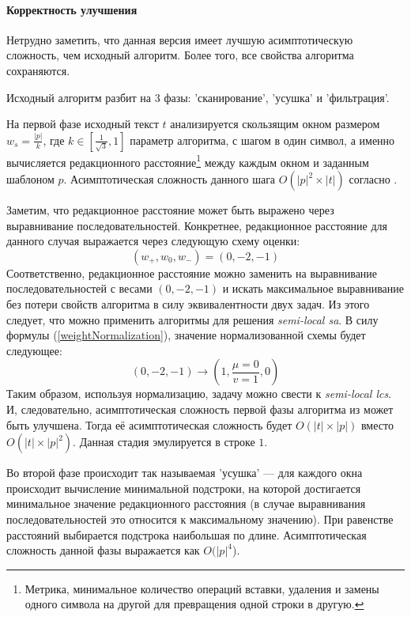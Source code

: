 \paragraph*{Корректность улучшения}\mbox{}

Нетрудно заметить, что данная версия имеет лучшую асимптотическую сложность, чем исходный алгоритм. Более того, все свойства алгоритма сохраняются.

Исходный алгоритм разбит на 3 фазы: 'сканирование', 'усушка' и 'фильтрация'.

На первой фазе исходный текст $t$ анализируется скользящим окном размером $w_{s} = \frac{|p|}{k}$, где $k \in [\frac{1}{\sqrt{3}},1]$ параметр алгоритма, с шагом в один символ, а именно вычисляется редакционного расстояние\footnote{Метрика, минимальное количество операций вставки, удаления и замены одного символа на другой для превращения одной строки в другую.} между каждым окном и заданным шаблоном $p$.
Асимптотическая сложность данного шага $O(|p|^2 \times |t|)$ согласно \cite{luciv2019interactive}.

Заметим, что редакционное расстояние может быть выражено через выравнивание последовательностей.
Конкретнее, редакционное расстояние для данного случая выражается через следующую схему оценки:
\begin{equation}\label{weightAppr}
    (w_{+},w_{0},w_{-}) = (0,-2,-1)
\end{equation}
Соответственно, редакционное расстояние можно заменить на выравнивание последовательностей с весами $(0,-2,-1)$ и искать максимальное выравнивание без потери свойств алгоритма в силу эквивалентности двух задач.
Из этого следует, что можно применить алгоритмы для решения \emph{semi-local sa}.
В силу  формулы (\ref{weightNormalization}), значение нормализованной схемы будет следующее:
\begin{equation}
    (0, -2, -1) \rightarrow (1,\frac{\mu=0}{v=1}, 0)
\end{equation}
Таким образом, используя нормализацию, задачу можно свести к \emph{semi-local lcs}.
И, следовательно, асимптотическая сложность первой фазы алгоритма  из \cite{luciv2019interactive} может быть улучшена. Тогда её асимптотическая сложность будет $O(|t| \times |p|)$ вместо $O(|t| \times |p|^2)$.
Данная стадия эмулируется в строке $1$.

Во второй фазе происходит так называемая 'усушка' --- для каждого окна происходит вычисление минимальной подстроки, на которой достигается минимальное значение редакционного расстояния (в случае выравнивания последовательностей это относится к максимальному значению).
При равенстве расстояний выбирается подстрока наибольшая по длине.
Асимптотическая сложность данной фазы выражается как $O(|p|^4$).

